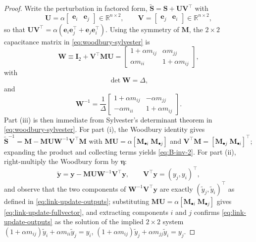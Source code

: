 \begin{proof}
Write the perturbation in factored form,
$\widetilde{\mathbf{S}} = \mathbf{S} + \mathbf{U} \mathbf{V}^\top$ with
\[
\mathbf{U}
=
\alpha
\begin{bmatrix}
\mathbf{e}_i & \mathbf{e}_j
\end{bmatrix}
\in \mathbb{R}^{n \times 2},
\qquad
\mathbf{V}
=
\begin{bmatrix}
\mathbf{e}_j & \mathbf{e}_i
\end{bmatrix}
\in \mathbb{R}^{n \times 2},
\]
so that $\mathbf{U} \mathbf{V}^\top = \alpha ( \mathbf{e}_i
\mathbf{e}_j^\top + \mathbf{e}_j \mathbf{e}_i^\top )$. Using the
symmetry of $\mathbf{M}$, the $2 \times 2$ capacitance matrix in
\eqref{eq:woodbury-sylvester} is
$$
\mathbf{W}
\equiv
\mathbf{I}_2 + \mathbf{V}^\top \mathbf{M} \mathbf{U}
=
\begin{bmatrix}
1 + \alpha m_{ij} & \alpha m_{jj} \\
\alpha m_{ii} & 1 + \alpha m_{ij}
\end{bmatrix},
$$
with
$$
\det \mathbf{W} = \Delta,
$$
and
$$
\mathbf{W}^{-1}
=
\frac{1}{\Delta}
\begin{bmatrix}
1 + \alpha m_{ij} & -\alpha m_{jj} \\
-\alpha m_{ii} & 1 + \alpha m_{ij}
\end{bmatrix}.
$$ 
Part (iii) is then immediate from Sylvester's determinant theorem in
\eqref{eq:woodbury-sylvester}. For part (i), the Woodbury identity gives
$\widetilde{\mathbf{S}}^{-1} = \mathbf{M} - \mathbf{M} \mathbf{U}
\mathbf{W}^{-1} \mathbf{V}^\top \mathbf{M}$ with $\mathbf{M} \mathbf{U}
= \alpha [ \mathbf{M}_{\bullet i}\; \mathbf{M}_{\bullet j} ]$ and
$\mathbf{V}^\top \mathbf{M} = [ \mathbf{M}_{\bullet j}\;
\mathbf{M}_{\bullet i} ]^\top$; expanding the product and collecting
terms yields \eqref{eq:B-inv-2}. For part (ii), right-multiply the Woodbury form by $\bm{\eta}$:
\[
\widetilde{\mathbf{y}}
=
\mathbf{y}
- \mathbf{M} \mathbf{U} \mathbf{W}^{-1} \mathbf{V}^\top \mathbf{y},
\qquad
\mathbf{V}^\top \mathbf{y} = ( y_j, y_i )^\top,
\]
and observe that the two components of $\mathbf{W}^{-1} \mathbf{V}^\top
\mathbf{y}$ are exactly $( \widetilde{y}_j, \widetilde{y}_i )^\top$ as
defined in \eqref{eq:link-update-outputs}; substituting
$\mathbf{M} \mathbf{U} = \alpha [ \mathbf{M}_{\bullet i}\;
\mathbf{M}_{\bullet j} ]$ gives \eqref{eq:link-update-fullvector}, and
extracting components $i$ and $j$ confirms
\eqref{eq:link-update-outputs} as the solution of the implied
$2 \times 2$ system $(1 + \alpha m_{ij}) \widetilde{y}_i + \alpha m_{ii}
\widetilde{y}_j = y_i$, $(1 + \alpha m_{ij}) \widetilde{y}_j + \alpha
m_{jj} \widetilde{y}_i = y_j$.
\end{proof}

